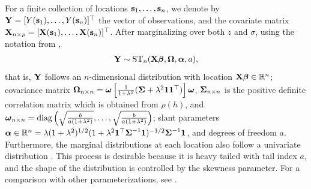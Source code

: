 For a finite collection of locations $\mathbf{s}_1, \ldots, \mathbf{s}_n$, we denote by $\mathbf{Y} = [Y(\mathbf{s}_1), \ldots, Y(\mathbf{s}_n)]^\top$ the vector of observations, and the covariate matrix $\mathbf{X}_{n \times p} = [\mathbf{X}(\mathbf{s}_1), \ldots, \mathbf{X}(\mathbf{s}_n)]^\top$.
After marginalizing over both $z$ and $\sigma$, using the notation from \citet[p. 176]{Azzalini2014},
\begin{align} \label{steq:stazzalini}
  \mathbf{Y} \sim \text{ST}_n(\mathbf{X} \mbox{\boldmath $\beta$}, \mbox{\boldmath $\Omega$}, \mbox{\boldmath $\alpha$}, a),
\end{align}
that is, $\mathbf{Y}$ follows an $n$-dimensional \skewt distribution with location $\mathbf{X} \mbox{\boldmath $\beta$} \in \mathbb{R}^n$; covariance matrix $\mbox{\boldmath $\Omega$}_{n \times n} = \mbox{\boldmath $\omega$} \left[ \frac{1}{1 + \lambda^2}(\mbox{\boldmath $\Sigma$} + \lambda^2 \mathbf{1} \mathbf{1}^\top) \right] \mbox{\boldmath $\omega$}$, $\mbox{\boldmath $\Sigma$}_{n \times n}$ is the positive definite correlation matrix which is obtained from $\rho(h)$, and $\mbox{\boldmath $\omega$}_{n \times n} = \text{diag}\left(\sqrt{\frac{ b }{a(1 + \lambda^2)}}, \ldots, \sqrt{\frac{ b }{a(1 + \lambda^2)}} \right)$; slant parameters $\mbox{\boldmath $\alpha$} \in \mathbb{R}^n = \lambda (1 + \lambda^2)^{1 / 2} (1 + \lambda^2 \mathbf{1}^\top \mbox{\boldmath $\Sigma$}^{-1} \mathbf{1})^{-1/2} \mbox{\boldmath $\Sigma$}^{-1} \mathbf{1}$, and degrees of freedom $a$.
Furthermore, the marginal distributions at each location also follow a univariate \skewt distribution \citep{Azzalini2014}.
This process is desirable because it is heavy tailed with tail index $a$, and the shape of the distribution is controlled by the skewness parameter.
For a comparison with other parameterizations, see .


